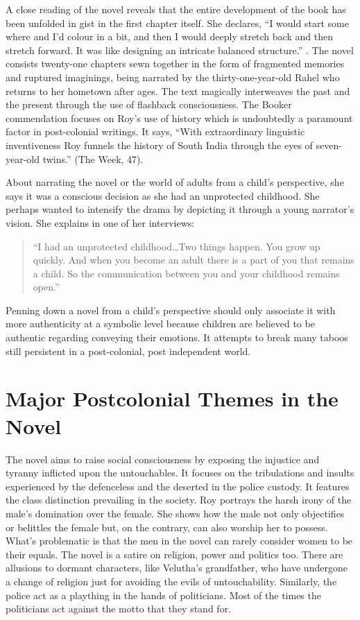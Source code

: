A close reading of the novel reveals that the entire development of the book has been unfolded in gist in the first chapter itself. She declares, ``I would start some where and I’d colour in a bit, and then I would deeply stretch back and then stretch forward. It was like designing an intricate balanced structure.'' \parencite{TalwarShashi}. The novel consists twenty-one chapters sewn together in the form of fragmented memories and ruptured imaginings, being narrated by the thirty-one-year-old Rahel who returns to her hometown after ages. The text magically interweaves the past and the present through the use of flashback consciousness. The Booker commendation focuses on Roy’s use of history which is undoubtedly a paramount factor in post-colonial writings. It says, ``With extraordinary linguistic inventiveness Roy funnels the history of South India through the eyes of seven-year-old twins.'' (The Week, 47).


About narrating the novel or the world of adults from a child’s perspective, she says it was a conscious decision as she had an unprotected childhood. She perhaps wanted to intensify the drama by depicting it through a young narrator’s vision. She explains in one of her interviews:

\begin{quote}
  “I had an unprotected childhood\ldots Two things happen. You grow up quickly. And when you become an adult there is a part of you that remains a child. So the communication between you and your childhood remains open.” \parencite{Abraham}
\end{quote}

Penning down a novel from a child’s perspective should only associate it with more authenticity at a symbolic level because children are believed to be authentic regarding conveying their emotions. It attempts to break many taboos still persistent in a post-colonial, post independent world.

\section{Major Postcolonial Themes in the Novel}

The novel aims to raise social consciousness by exposing the injustice and tyranny inflicted upon the untouchables. It focuses on the tribulations and insults experienced by the defenceless and the deserted in the police custody. It features the class distinction prevailing in the society. Roy portrays the harsh irony of the male’s domination over the female. She shows how the male not only objectifies or belittles the female but, on the contrary, can also worship her to possess. What’s problematic is that the men in the novel can rarely consider women to be their equals. The novel is a satire on religion, power and politics too. There are allusions to dormant characters, like Velutha’s grandfather, who have undergone a change of religion just for avoiding the evils of untouchability. Similarly, the police act as a plaything in the hands of politicians. Most of the times the politicians act against the motto that they stand for.

